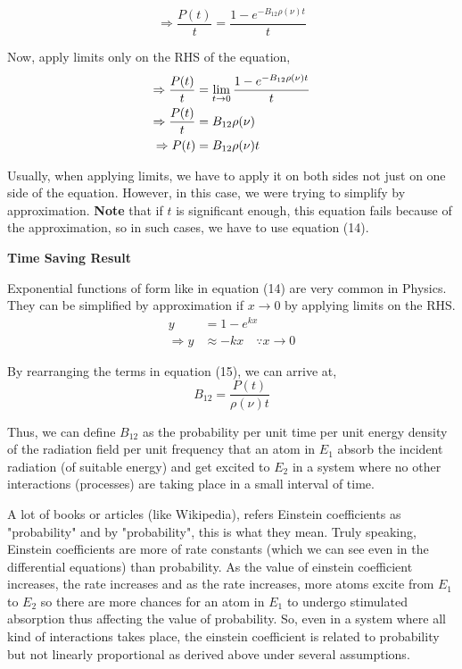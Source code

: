 \documentclass[12pt]{article}
\begin{document}
\begin{equation*}
    \Rightarrow \frac{P(t)}{t} = \frac{1 - e^{-B_{12}\rho(\nu)t}}{t}
\end{equation*} \vspace{.05cm}

Now, apply limits only on the RHS of the equation,
\begin{align}
    \Rightarrow \frac{P(t)}{t} &= \lim_{t \to 0} \frac{1 - e^{-B_{12}\rho(\nu)t}}{t} \notag \\
    \Rightarrow \frac{P(t)}{t} &= B_{12}\rho(\nu) \notag \\
    \Rightarrow P(t) &= B_{12}\rho(\nu)t
\end{align} 

Usually, when applying limits, we have to apply it on both sides not just on one side of the equation. However, in this case, we were trying to simplify by approximation. \textbf{Note} that if $t$ is significant enough, this equation fails because of the approximation, so in such cases, we have to use equation (14). \vspace{.2cm}

\begin{note}
    \textbf{Time Saving Result} \vspace{.2cm}

    Exponential functions of form like in equation (14) are very common in Physics. They can be simplified by approximation if $x \to 0$ by applying limits on the RHS.
    \begin{align*}
        y &= 1-e^{kx} \\
        \Rightarrow y & \approx -kx \quad \because x \to 0
    \end{align*}
\end{note}

By rearranging the terms in equation (15), we can arrive at,
\begin{equation*}
    B_{12} = \frac{P(t)}{\rho(\nu)t}
\end{equation*}

Thus, we can define $B_{12}$ as the probability per unit time per unit energy density of the radiation field per unit frequency that an atom in $E_{1}$ absorb the incident radiation (of suitable energy) and get excited to $E_{2}$ in a system where no other interactions (processes) are taking place in a small interval of time. \vspace{.2cm}

A lot of books or articles (like Wikipedia), refers Einstein coefficients as "probability" and by "probability", this is what they mean. Truly speaking, Einstein coefficients are more of rate constants (which we can see even in the differential equations) than probability. As the value of einstein coefficient increases, the rate increases and as the rate increases, more atoms excite from $E_{1}$ to $E_{2}$ so there are more chances for an atom in $E_{1}$ to undergo stimulated absorption thus affecting the value of probability. So, even in a system where all kind of interactions takes place, the einstein coefficient is related to probability but not linearly proportional as derived above under several assumptions.
\end{document}
